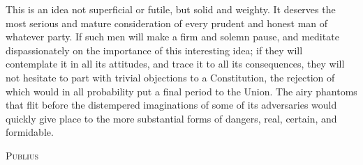 This is an idea not superficial or futile, but solid and weighty. It deserves the most serious and mature consideration of every prudent and honest man of whatever party. If such men will make a firm and solemn pause, and meditate dispassionately on the importance of this interesting idea; if they will contemplate it in all its attitudes, and trace it to all its consequences, they will not hesitate to part with trivial objections to a Constitution, the rejection of which would in all probability put a final period to the Union. The airy phantoms that flit before the distempered imaginations of some of its adversaries would quickly give place to the more substantial forms of dangers, real, certain, and formidable.

\vspace{.5cm}
\textsc{Publius}

\vspace{1.5cm}

